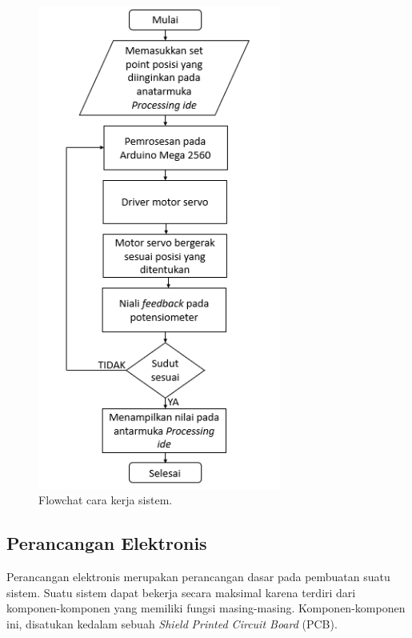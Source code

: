 \begin{figure}[H]
	\centering
	\includegraphics[width=8cm	]{gambar/flowchart.png}
	\caption{Flowchat cara kerja sistem.}
\end{figure}
	
	\subsection{Perancangan Elektronis}
	Perancangan elektronis merupakan perancangan dasar pada pembuatan suatu sistem. Suatu sistem dapat bekerja secara maksimal karena terdiri dari komponen-komponen yang memiliki fungsi masing-masing. Komponen-komponen ini, disatukan kedalam sebuah \textit{Shield} \textit{Printed Circuit Board} (PCB). 
	
